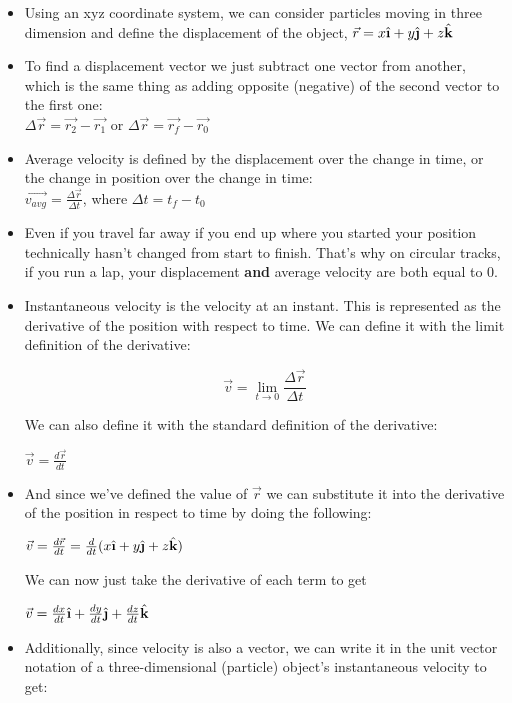 \documentclass[openany]{book}
\newcommand{\ihat}{\hat{\textbf{\i}}}
\newcommand{\jhat}{\hat{\textbf{\j}}}
\newcommand{\khat}{\hat{\textbf{k}}}
\begin{document}
\begin{itemize}
    \item Using an xyz coordinate system, we can consider particles moving in three dimension and define the displacement of the object, $\vec{r} = x{\ihat} + y{\jhat} + z{\khat}$
    \item To find a displacement vector we just subtract one vector from another, which is the same thing as adding opposite (negative) of the second vector to the first one:
    \\
    $\Delta\vec{r} = \vec{r_2} - \vec{r_1}$ or
    $\Delta\vec{r} = \vec{r_f} -\vec{r_0}$
    \item Average velocity is defined by the displacement over the change in time, or the change in position over the change in time:
    \\
    $\vec{v_{avg}} = \frac{\Delta\vec{r}}{\Delta{t}}$, where $\Delta{t} = t_f - t_0$
    \item Even if you travel far away if you end up where you started your position technically hasn't changed from start to finish. That's why on circular tracks, if you run a lap, your displacement {\bfseries{and}} average velocity are both equal to 0.
    \item Instantaneous velocity is the velocity at an instant. This is represented as the derivative of the position with respect to time. We can define it with the limit definition of the derivative:
     
    \[\vec{v} = \lim_{t\to0} \frac{\Delta\vec{r}}{\Delta t} \]

    We can also define it with the standard definition of the derivative:

    $\vec{v} = \frac{d\vec{r}}{dt}$

    \item And since we've defined the value of $\vec{r}$ we can substitute it into the derivative of the position in respect to time by doing the following:
    
    $\vec{v} = \frac{d\vec{r}}{dt} = \frac{d}{dt}(x{\ihat} + y{\jhat} + z{\khat})$

    We can now just take the derivative of each term to get

    $\vec{v} = \frac{dx}{dt}{\ihat} + \frac{dy}{dt}{\jhat} + \frac{dz}{dt}{\khat}$

    \item Additionally, since velocity is also a vector, we can write it in the unit vector notation of a three-dimensional (particle) object's instantaneous velocity to get:
    

\end{itemize}
\end{document}
